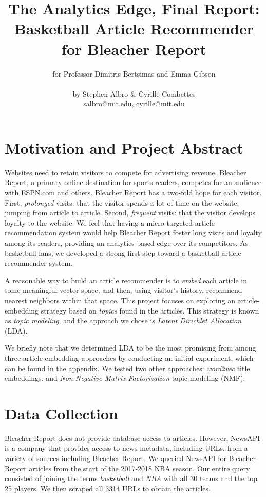 \documentclass[11pt]{article}
\title{The Analytics Edge, Final Report:\\ Basketball Article Recommender for Bleacher Report}
\author{for Professor Dimitris Bertsimas and Emma Gibson \text{ } \\ \\ by Stephen Albro \& Cyrille Combettes \\ salbro@mit.edu, cyrille@mit.edu}
\begin{document}
\maketitle{}


\section{Motivation and Project Abstract}
Websites need to retain visitors to compete for advertising revenue. Bleacher Report, a primary online destination for sports readers, competes for an audience with ESPN.com and others. Bleacher Report has a two-fold hope for each visitor. First, \textit{prolonged} visits: that the visitor spends a lot of time on the website, jumping from article to article.  Second, \textit{frequent} visits: that the visitor develops loyalty to the website.  We feel that having a micro-targeted article recommendation system would help Bleacher Report foster long visits and loyalty among its readers, providing an analytics-based edge over its competitors.  As basketball fans, we developed a strong first step toward a basketball article recommender system.

A reasonable way to build an article recommender is to \textit{embed} each article in some meaningful vector 
space, and then, using visitor's history, recommend nearest neighbors within that space. This project focuses on 
exploring an article-embedding strategy based on \textit{topics} found in the articles. This strategy is known as 
\textit{topic modeling},
and the approach we chose is \textit{Latent Dirichlet Allocation} (LDA).  

We briefly note that we determined LDA to be the most promising
from among three article-embedding approaches by conducting an initial experiment,
which  can be found in the appendix. We tested two other approaches: \emph{word2vec} title
embeddings, and \emph{Non-Negative Matrix Factorization} topic modeling (NMF). 

\section{Data Collection}
Bleacher Report does not provide database access to articles.  However, NewsAPI is a company that provides access to news metadata, including URLs, from a variety of sources including Bleacher Report.  We queried NewsAPI for Bleacher Report articles from the start of the 2017-2018 NBA season. Our entire query consisted of joining the terms \textit{basketball} and \textit{NBA} with all 30 teams and the top 25 players.  We then scraped all 3314 URLs to obtain the articles.
\end{document}
